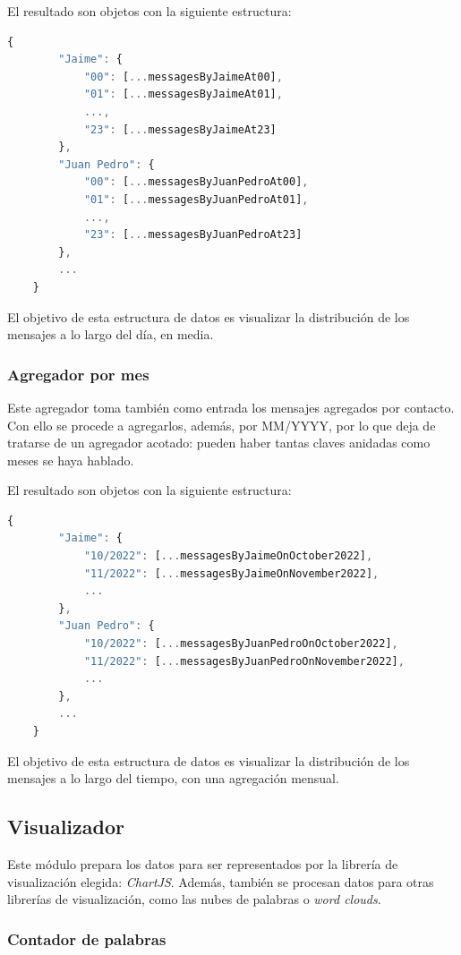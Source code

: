 El resultado son objetos con la siguiente estructura:

\begin{lstlisting}[language=JavaScript]
	{
		"Jaime": {
			"00": [...messagesByJaimeAt00],
			"01": [...messagesByJaimeAt01],
			...,
			"23": [...messagesByJaimeAt23]
		},
		"Juan Pedro": {
			"00": [...messagesByJuanPedroAt00],
			"01": [...messagesByJuanPedroAt01],
			...,
			"23": [...messagesByJuanPedroAt23]
		},
		...
	}
\end{lstlisting}

El objetivo de esta estructura de datos es visualizar la distribución de los mensajes a lo largo del día, en media.

\subsubsection{Agregador por mes}

Este agregador toma también como entrada los mensajes agregados por contacto. Con ello se procede a agregarlos, además, por MM/YYYY, por lo que deja de tratarse de un agregador acotado: pueden haber tantas claves anidadas como meses se haya hablado.

El resultado son objetos con la siguiente estructura:

\begin{lstlisting}[language=JavaScript]
	{
		"Jaime": {
			"10/2022": [...messagesByJaimeOnOctober2022],
			"11/2022": [...messagesByJaimeOnNovember2022],
			...
		},
		"Juan Pedro": {
			"10/2022": [...messagesByJuanPedroOnOctober2022],
			"11/2022": [...messagesByJuanPedroOnNovember2022],
			...
		},
		...
	}
\end{lstlisting}

El objetivo de esta estructura de datos es visualizar la distribución de los mensajes a lo largo del tiempo, con una agregación mensual.

\subsection{Visualizador}


Este módulo prepara los datos para ser representados por la librería de visualización elegida: \textit{ChartJS}. Además, también se procesan datos para otras librerías de visualización, como las nubes de palabras o \textit{word clouds}.

\subsubsection{Contador de palabras}

